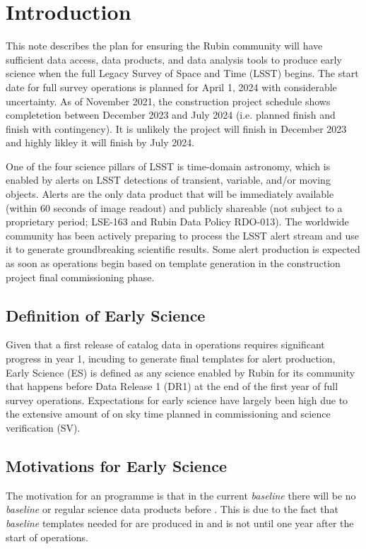 \section{Introduction}

This  note describes the plan for ensuring the Rubin community will have sufficient data access, data products, and data analysis tools to produce early science when the full Legacy Survey of Space and Time (LSST)  begins. The start date for full survey operations is planned for April 1, 2024 with considerable uncertainty. As of November 2021, the construction project schedule shows completetion between December 2023 and July 2024 (i.e. planned finish and finish with contingency). It is unlikely the project will finish in December 2023 and highly likley it will finish by July 2024. 

One of the four science pillars of LSST is time-domain astronomy, which is enabled by alerts
on LSST detections of transient, variable, and/or moving objects. 
Alerts are the only data product that will be immediately available (within 60 seconds of image readout) and publicly shareable (not subject to a proprietary period; LSE-163 and Rubin Data Policy RDO-013). 
The worldwide community has been actively preparing to process the LSST alert stream and use it to generate groundbreaking scientific results. Some alert production is expected as soon as operations begin based on template generation in the construction project final commissioning phase.  

\subsection{Definition of Early Science}  \label{ssec:defn}

Given that a first release of catalog data in operations requires significant progress in year 1, incuding to generate final templates for alert production, Early Science (ES) is defined as any science enabled by Rubin for its community that happens before Data Release 1 (DR1) at the end of the first year of full survey operations. Expectations for early science have largely been high due to the extensive amount of on sky time planned in commissioning and science verification (SV).  

\subsection{Motivations for Early Science}
The motivation for an \es programme is that in the current {\it baseline} there will be no {\it baseline} or regular science data products before \drone. 
This is due to the fact that {\it baseline} templates needed for \diffim are produced in \drp and \drone is not until one year after the start of operations.

